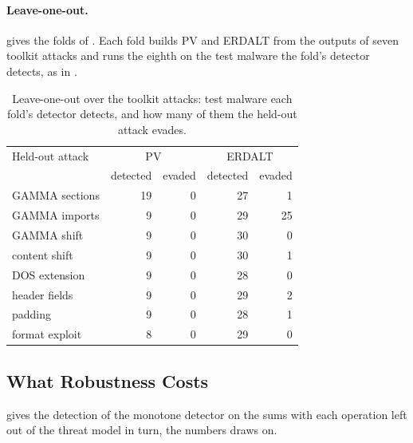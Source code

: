 \paragraph{Leave-one-out.}  gives the folds of . Each fold builds PV and
ERDALT from the outputs of seven toolkit attacks and runs the eighth on the test malware the fold's detector detects,
as in .

\begin{table}[t]
  \caption{Leave-one-out over the toolkit attacks: test malware each fold's detector detects, and how many of them the
  held-out attack evades.}
  \label{tab:ember:loo}
  \small
  \begin{tabular}{@{}lrrrr@{}}
    \toprule
    Held-out attack & \multicolumn{2}{c}{PV} & \multicolumn{2}{c}{ERDALT} \\
    & detected & evaded & detected & evaded \\
    \midrule
    GAMMA sections & 19 & 0 & 27 & 1 \\
    GAMMA imports & 9 & 0 & 29 & 25 \\
    GAMMA shift & 9 & 0 & 30 & 0 \\
    content shift & 9 & 0 & 30 & 1 \\
    DOS extension & 9 & 0 & 28 & 0 \\
    header fields & 9 & 0 & 29 & 2 \\
    padding & 9 & 0 & 28 & 1 \\
    format exploit & 8 & 0 & 29 & 0 \\
    \bottomrule
  \end{tabular}
\end{table}

\subsection{What Robustness Costs}
\label{sec:attacks:cost}

 gives the detection of the monotone detector on the sums with each operation left out of the
threat model in turn, the numbers  draws on.

